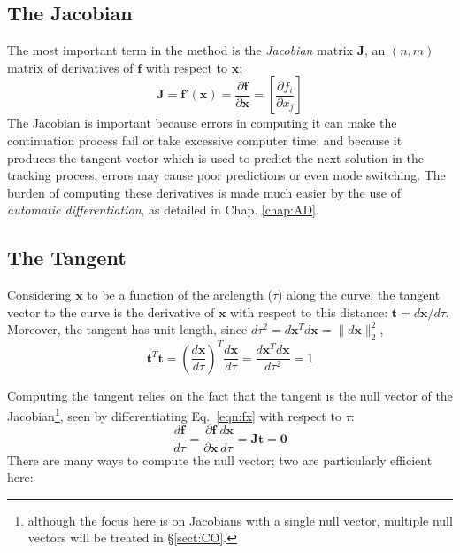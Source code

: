 \documentclass[10pt,openany,twoside]{book}
\numberwithin{equation}{section}   %
\newcommand{\Matrix}[1]{\boldsymbol{#1}}
\newcommand{\Vector}[1]{\boldsymbol{#1}}
\newcommand{\Sectref}[1]{\S\ref{#1}}
\newcommand{\Chapref}[1]{Chap. \ref{#1}}
\newcommand{\Eqn}[1]{Eq.\ \ref{#1}}
\begin{document}
\subsection{The Jacobian}
The most important term in the method is the \emph{Jacobian} matrix
$\Matrix{J}$, an $(n,m)$ matrix of derivatives of $\Vector{f}$ with
respect to $\Vector{x}$:
\begin{equation}\label{eqn:jacobian}
	\Matrix{J} = \Vector{f}'(\Vector{x}) =
		\frac{\partial \Vector{f}}{\partial \Vector{x}} =
		\left[\frac{\partial f_i}{\partial x_j}\right]
\end{equation}
The Jacobian is important because errors in computing it can make the
continuation process fail or take excessive computer time;
and because it produces the tangent vector which is used to
predict the next solution in the tracking process, errors may cause
poor predictions or even mode switching.
The burden of computing these derivatives is made much easier by the use of
\emph{automatic differentiation},
as detailed in \Chapref{chap:AD}.

\subsection{The Tangent}\label{sect:the-tangent}
Considering $\Vector{x}$ to be a function of the arclength ($\tau$) along the
curve, the tangent vector to the curve is the derivative of $\Vector{x}$
with respect to this distance: $\Vector{t} = d\Vector{x}/d\tau$.
Moreover, the tangent has unit length, since
	$d\tau^2 = d\Vector{x}^T d\Vector{x} = \|d\Vector{x}\|_2^2$,
\begin{displaymath}
\Vector{t}^T\Vector{t} =
	\left(\frac{d\Vector{x}}{d\tau}\right)^T \frac{d\Vector{x}}{d\tau}
	= \frac{d\Vector{x}^T d\Vector{x}}{d\tau^2} = 1
\end{displaymath}

Computing the tangent relies on the fact that the tangent is the null
vector of the Jacobian\footnote{although the focus here is on Jacobians with a single
null vector, multiple null vectors will be treated in \Sectref{sect:CO}.},
seen by differentiating \Eqn{eqn:fx} with respect to $\tau$:
\begin{equation}\label{eqn:Jt}
	\frac{d\Vector{f}}{d\tau} = \frac{\partial\Vector{f}}{\partial\Vector{x}}\frac{d\Vector{x}}{d\tau}
		= \Vector{Jt} = \Vector{0}
\end{equation}
There are many ways to compute the null vector; two are particularly efficient here:
\end{document}
